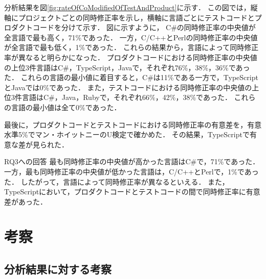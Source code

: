 \documentclass[T,J]{fose}
\begin{document}
分析結果を図\ref{fig:rateOfCoModifiedOfTestAndProduct}に示す．
この図では，縦軸にプロジェクトごとの同時修正率を示し，横軸に言語ごとにテストコードとプロダクトコードを分けて示す．
図に示すように，
C\#の同時修正率の中央値が全言語で最も高く，71\%であった．
一方，C/C++とPerlの同時修正率の中央値が全言語で最も低く，1\%であった．
これらの結果から，言語によって同時修正率が異なると明らかになった．
プロダクトコードにおける同時修正率の中央値の上位3件言語はC\#，TypeScript，Javaで，それぞれ76\%，38\%，36\%であった．
これらの言語の最小値に着目すると，C\#は11\%である一方で，TypeScriptとJavaでは0\%であった．
また，テストコードにおける同時修正率の中央値の上位3件言語はC\#，Java，Rubyで，それぞれ66\%，42\%，38\%であった．
これらの言語の最小値は全て0\%であった．

最後に，プロダクトコードとテストコードにおける同時修正率の有意差を，有意水準5\%でマン・ホイットニーのU検定で確かめた．
その結果，TypeScriptで有意な差が見られた．

\begin{itembox}[l]{RQ3への回答}
最も同時修正率の中央値が高かった言語はC\#で，71\%であった．
一方，最も同時修正率の中央値が低かった言語は，C/C++とPerlで，1\%であった．
したがって，言語によって同時修正率が異なるといえる．
また，TypeScriptにおいて，プロダクトコードとテストコードの間で同時修正率に有意差があった．
\end{itembox}

\section{考察}


\subsection{分析結果に対する考察}



\end{document}
